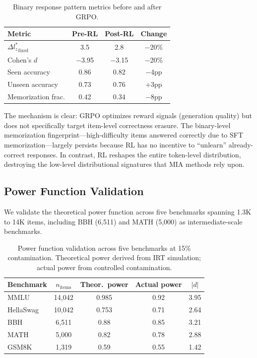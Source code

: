 \documentclass[11pt,a4paper]{article}
\begin{document}
\begin{table}[h]
\centering
\small
\caption{Binary response pattern metrics before and after GRPO.}
\label{tab:postrl_detail}
\begin{tabular}{lccc}
\toprule
\textbf{Metric} & \textbf{Pre-RL} & \textbf{Post-RL} & \textbf{Change} \\
\midrule
${\Delta l_z^*}_\text{fixed}$ & 3.5 & 2.8 & $-$20\% \\
Cohen's $d$ & $-$3.95 & $-$3.15 & $-$20\% \\
Seen accuracy & 0.86 & 0.82 & $-$4pp \\
Unseen accuracy & 0.73 & 0.76 & +3pp \\
Memorization frac. & 0.42 & 0.34 & $-$8pp \\
\bottomrule
\end{tabular}
\end{table}

The mechanism is clear: GRPO optimizes reward signals (generation quality) but does not specifically target item-level correctness erasure.
The binary-level memorization fingerprint---high-difficulty items answered correctly due to SFT memorization---largely persists because RL has no incentive to ``unlearn'' already-correct responses.
In contrast, RL reshapes the entire token-level distribution, destroying the low-level distributional signatures that MIA methods rely upon.

\subsection{Power Function Validation}
\label{sec:power}

We validate the theoretical power function across five benchmarks spanning 1.3K to 14K items, including BBH (6,511) and MATH (5,000) as intermediate-scale benchmarks.

\begin{table}[h]
\centering
\small
\caption{Power function validation across five benchmarks at 15\% contamination. Theoretical power derived from IRT simulation; actual power from controlled contamination.}
\label{tab:power}
\begin{tabular}{lcccc}
\toprule
\textbf{Benchmark} & $n_\text{items}$ & \textbf{Theor.~power} & \textbf{Actual power} & $|d|$ \\
\midrule
MMLU & 14,042 & 0.985 & 0.92 & 3.95 \\
HellaSwag & 10,042 & 0.753 & 0.71 & 2.64 \\
BBH & 6,511 & 0.88 & 0.85 & 3.21 \\
MATH & 5,000 & 0.82 & 0.78 & 2.88 \\
GSM8K & 1,319 & 0.59 & 0.55 & 1.42 \\
\bottomrule
\end{tabular}
\end{table}
\end{document}
